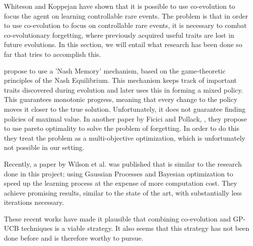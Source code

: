 

%
Whiteson and Koppejan have shown that it is possible to use co-evolution to focus the agent on learning controllable rare events. The problem is that in order to use co-evolution to focus on controllable rare events, it is necessary to combat co-evolutionary forgetting, where previously acquired useful traits are lost in future evolutions. In this section, we will entail what research has been done so far that tries to accomplish this.

\cite{ficici2003game} propose to use a 'Nash Memory' mechanism, based on the game-theoretic principles of the Nash Equilibrium. This mechanism keeps track of important traits discovered during evolution and later uses this in forming a mixed policy. This guarantees monotonic progress, meaning that every change to the policy moves it closer to the true solution. Unfortunately, it does not guarantee finding policies of maximal value. In another paper by Ficici and Pollack, \cite{ficici2001pareto}, they propose to use pareto optimality to solve the problem of forgetting. In order to do this they treat the problem as a multi-objective optimization, which is unfortunately not possible in our setting.

Recently, a paper by Wilson et al. \cite{wilson2014using} was published that is similar to the research done in this project; using Gaussian Processes and Bayesian optimization to speed up the learning process at the expense of more computation cost. They achieve promising results, similar to the state of the art, with substantially less iterations necessary.

These recent works have made it plausible that combining co-evolution and GP-UCB techniques is a viable strategy. It also seems that this strategy has not been done before and is therefore worthy to pursue.